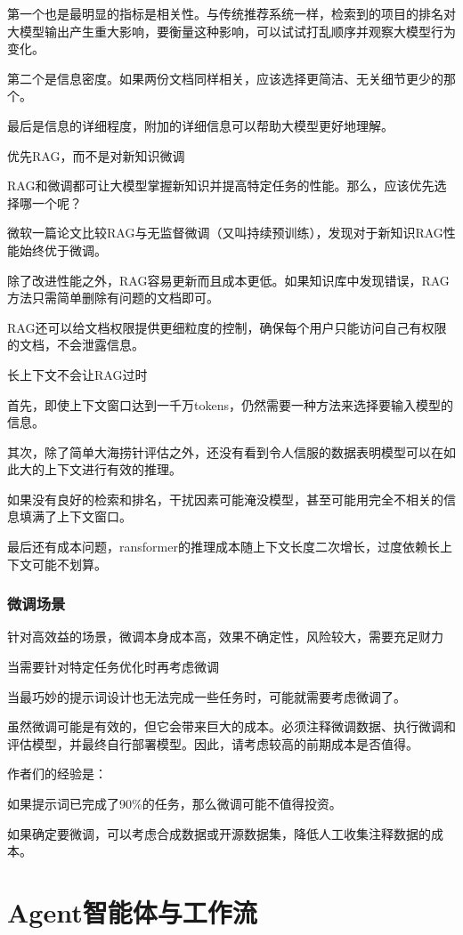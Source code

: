 \documentclass[12pt]{book}
\begin{document}
第一个也是最明显的指标是相关性。与传统推荐系统一样，检索到的项目的排名对大模型输出产生重大影响，要衡量这种影响，可以试试打乱顺序并观察大模型行为变化。

第二个是信息密度。如果两份文档同样相关，应该选择更简洁、无关细节更少的那个。

最后是信息的详细程度，附加的详细信息可以帮助大模型更好地理解。


优先RAG，而不是对新知识微调

RAG和微调都可让大模型掌握新知识并提高特定任务的性能。那么，应该优先选择哪一个呢？

微软一篇论文比较RAG与无监督微调（又叫持续预训练），发现对于新知识RAG性能始终优于微调。

除了改进性能之外，RAG容易更新而且成本更低。如果知识库中发现错误，RAG方法只需简单删除有问题的文档即可。

RAG还可以给文档权限提供更细粒度的控制，确保每个用户只能访问自己有权限的文档，不会泄露信息。

长上下文不会让RAG过时

首先，即使上下文窗口达到一千万tokens，仍然需要一种方法来选择要输入模型的信息。

其次，除了简单大海捞针评估之外，还没有看到令人信服的数据表明模型可以在如此大的上下文进行有效的推理。

如果没有良好的检索和排名，干扰因素可能淹没模型，甚至可能用完全不相关的信息填满了上下文窗口。

最后还有成本问题，ransformer的推理成本随上下文长度二次增长，过度依赖长上下文可能不划算。



\subsection{微调场景}
针对高效益的场景，微调本身成本高，效果不确定性，风险较大，需要充足财力

当需要针对特定任务优化时再考虑微调

当最巧妙的提示词设计也无法完成一些任务时，可能就需要考虑微调了。

虽然微调可能是有效的，但它会带来巨大的成本。必须注释微调数据、执行微调和评估模型，并最终自行部署模型。因此，请考虑较高的前期成本是否值得。

作者们的经验是：

如果提示词已完成了90\%的任务，那么微调可能不值得投资。

如果确定要微调，可以考虑合成数据或开源数据集，降低人工收集注释数据的成本。
\chapter{Agent智能体与工作流}
\end{document}
